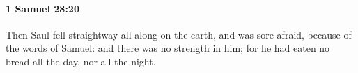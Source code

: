 
		\paragraph{1 Samuel 28:20} %
			\label{1SAMUEL-28-20}

			Then Saul fell straightway all along on the earth, and was sore afraid, because of the words of Samuel: and there was no strength in him; for he had eaten no bread all the day, nor all the night.



